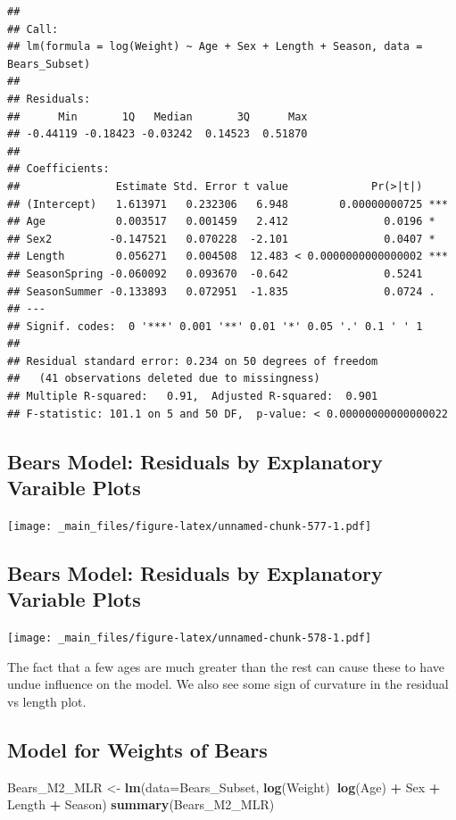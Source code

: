 \documentclass[]{book}
\newenvironment{Shaded}{\begin{snugshade}}{\end{snugshade}}
\newcommand{\KeywordTok}[1]{\textcolor[rgb]{0.13,0.29,0.53}{\textbf{#1}}}
\newcommand{\DataTypeTok}[1]{\textcolor[rgb]{0.13,0.29,0.53}{#1}}
\newcommand{\StringTok}[1]{\textcolor[rgb]{0.31,0.60,0.02}{#1}}
\newcommand{\OperatorTok}[1]{\textcolor[rgb]{0.81,0.36,0.00}{\textbf{#1}}}
\newcommand{\NormalTok}[1]{#1}
\begin{document}
\begin{verbatim}
## 
## Call:
## lm(formula = log(Weight) ~ Age + Sex + Length + Season, data = Bears_Subset)
## 
## Residuals:
##      Min       1Q   Median       3Q      Max 
## -0.44119 -0.18423 -0.03242  0.14523  0.51870 
## 
## Coefficients:
##               Estimate Std. Error t value             Pr(>|t|)    
## (Intercept)   1.613971   0.232306   6.948        0.00000000725 ***
## Age           0.003517   0.001459   2.412               0.0196 *  
## Sex2         -0.147521   0.070228  -2.101               0.0407 *  
## Length        0.056271   0.004508  12.483 < 0.0000000000000002 ***
## SeasonSpring -0.060092   0.093670  -0.642               0.5241    
## SeasonSummer -0.133893   0.072951  -1.835               0.0724 .  
## ---
## Signif. codes:  0 '***' 0.001 '**' 0.01 '*' 0.05 '.' 0.1 ' ' 1
## 
## Residual standard error: 0.234 on 50 degrees of freedom
##   (41 observations deleted due to missingness)
## Multiple R-squared:   0.91,  Adjusted R-squared:  0.901 
## F-statistic: 101.1 on 5 and 50 DF,  p-value: < 0.00000000000000022
\end{verbatim}

\subsection{Bears Model: Residuals by Explanatory Varaible
Plots}\label{bears-model-residuals-by-explanatory-varaible-plots}

\texttt{[image: \_main\_files/figure-latex/unnamed-chunk-577-1.pdf]}

\subsection{Bears Model: Residuals by Explanatory Variable
Plots}\label{bears-model-residuals-by-explanatory-variable-plots}

\texttt{[image: \_main\_files/figure-latex/unnamed-chunk-578-1.pdf]}

The fact that a few ages are much greater than the rest can cause these
to have undue influence on the model. We also see some sign of curvature
in the residual vs length plot.

\subsection{Model for Weights of
Bears}\label{model-for-weights-of-bears-1}

\begin{Shaded}
\begin{Highlighting}[]
\NormalTok{Bears_M2_MLR <-}\StringTok{ }\KeywordTok{lm}\NormalTok{(}\DataTypeTok{data=}\NormalTok{Bears_Subset, }\KeywordTok{log}\NormalTok{(Weight)}\OperatorTok{~}\KeywordTok{log}\NormalTok{(Age) }\OperatorTok{+}\StringTok{ }\NormalTok{Sex }\OperatorTok{+}\StringTok{ }\NormalTok{Length }\OperatorTok{+}\StringTok{ }\NormalTok{Season)}
\KeywordTok{summary}\NormalTok{(Bears_M2_MLR)}
\end{Highlighting}
\end{Shaded}
\end{document}
